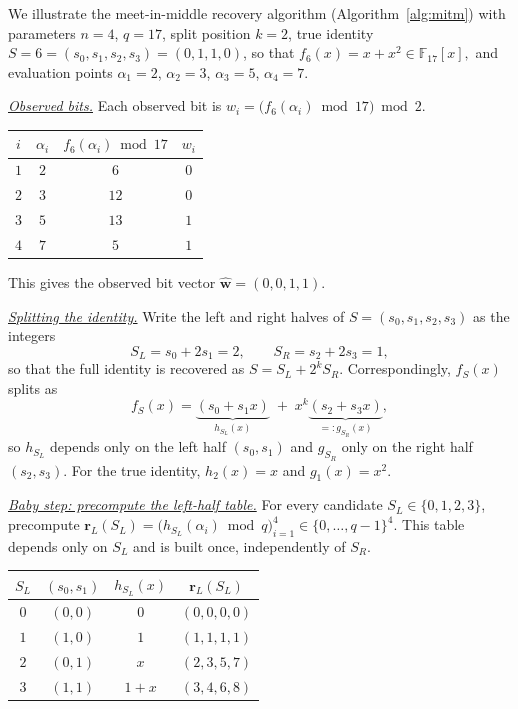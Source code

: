 \documentclass[a4paper,11pt]{llncs}
\begin{document}
{\small
\begin{example}
We illustrate the meet-in-middle recovery algorithm
(Algorithm~\ref{alg:mitm}) with parameters $n=4$, $q=17$, split
position $k=2$, true identity $S=6=(s_0,s_1,s_2,s_3)=(0,1,1,0)$,
so that
$f_6(x) = x + x^2 \in \mathbb F_{17}[x],$
and evaluation points $\alpha_1=2$, $\alpha_2=3$, $\alpha_3=5$,
$\alpha_4=7$.

\noindent
\underline{\it Observed bits.}
Each observed bit is $w_i = \bigl(f_6(\alpha_i) \bmod 17\bigr) \bmod 2$.
%
\begin{center}
\begin{tabular}{cccc}
\hline
$i$ & $\alpha_i$ & $f_6(\alpha_i) \bmod 17$ & $w_i$ \\
\hline
$1$ & $2$ & $6$  & $0$ \\
$2$ & $3$ & $12$ & $0$ \\
$3$ & $5$ & $13$ & $1$ \\
$4$ & $7$ & $5$  & $1$ \\
\hline
\end{tabular}
\end{center}
%
This gives the observed bit vector $\hat{\mathbf w} = (0,0,1,1)$.

\noindent
\underline{\it Splitting the identity.}
Write the left and right halves of $S=(s_0,s_1,s_2,s_3)$ as the
integers
\[
S_L = s_0 + 2 s_1 = 2,
\qquad
S_R = s_2 + 2 s_3 = 1,
\]
so that the full identity is recovered as $S = S_L + 2^{k} S_R$.
Correspondingly, $f_S(x)$ splits as
\[
f_S(x) = \underbrace{(s_0 + s_1 x)}_{h_{S_L}(x)}
       \;+\; x^{k}\underbrace{(s_2 + s_3 x)}_{\textstyle =: g_{S_R}(x)},
\]
so $h_{S_L}$ depends only on the left half $(s_0,s_1)$ and
$g_{S_R}$ only on the right half $(s_2,s_3)$. For the true identity,
$h_2(x) = x$ and $g_1(x) = x^2$.

\noindent
\underline{\it Baby step: precompute the left-half table.}
For every candidate $S_L \in \{0,1,2,3\}$, precompute
$\mathbf r_L(S_L) =
\bigl(h_{S_L}(\alpha_i) \bmod q\bigr)_{i=1}^{4}
\in \{0,\ldots,q-1\}^{4}.$
This table depends only on $S_L$ and is built once, independently
of $S_R$.
%
\begin{center}
\begin{tabular}{cccc}
\hline
$S_L$ & $(s_0,s_1)$ & $h_{S_L}(x)$ & $\mathbf r_L(S_L)$ \\
\hline
$0$ & $(0,0)$ & $0$   & $(0,0,0,0)$ \\
$1$ & $(1,0)$ & $1$   & $(1,1,1,1)$ \\
$2$ & $(0,1)$ & $x$   & $(2,3,5,7)$ \\
$3$ & $(1,1)$ & $1+x$ & $(3,4,6,8)$ \\
\hline
\end{tabular}
\end{center}


\end{example}}
\end{document}
